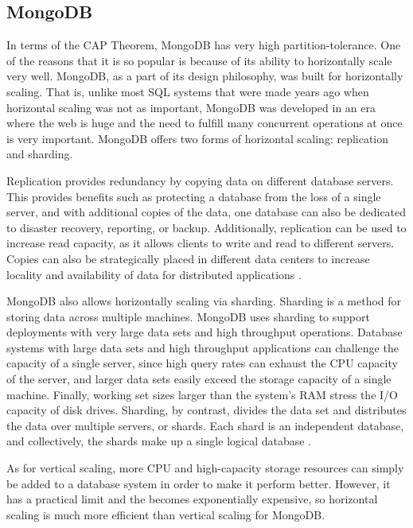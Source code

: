 \documentclass[12pt]{article}
\begin{document}
\subsection{MongoDB}

In terms of the CAP Theorem, MongoDB has very high partition-tolerance. One of the reasons that it is so popular is because of its ability to horizontally scale very well. MongoDB, as a part of its design philosophy, was built for horizontally scaling. That is, unlike most SQL systems that were made years ago when horizontal scaling was not as important, MongoDB was developed in an era where the web is huge and the need to fulfill many concurrent operations at once is very important. MongoDB offers two forms of horizontal scaling: replication and sharding.

Replication provides redundancy by copying data on different database servers. This provides benefits such as protecting a database from the loss of a single server, and with additional copies of the data, one database can also be dedicated to disaster recovery, reporting, or backup. Additionally, replication can be used to increase read capacity, as it allows clients to write and read to different servers. Copies can also be strategically placed in different data centers to increase locality and availability of data for distributed applications \cite{replication}.

MongoDB also allows horizontally scaling via sharding. Sharding is a method for storing data across multiple machines. MongoDB uses sharding to support deployments with very large data sets and high throughput operations. Database systems with large data sets and high throughput applications can challenge the capacity of a single server, since high query rates can exhaust the CPU capacity of the server, and larger data sets easily exceed the storage capacity of a single machine. Finally, working set sizes larger than the system’s RAM stress the I/O capacity of disk drives. Sharding, by contrast, divides the data set and distributes the data over multiple servers, or shards. Each shard is an independent database, and collectively, the shards make up a single logical database \cite{sharding}.

As for vertical scaling, more CPU and high-capacity storage resources can simply be added to a database system in order to make it perform better. However, it has a practical limit and the becomes exponentially expensive, so horizontal scaling is much more efficient than vertical scaling for MongoDB.
\end{document}
